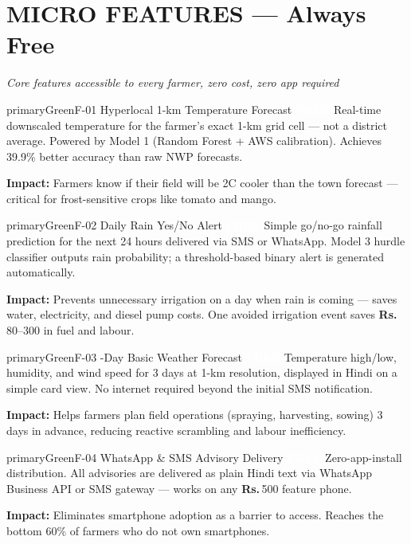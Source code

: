 \documentclass[12pt,a4paper]{article}
\newcommand{\Rup}{\textbf{Rs.\,}}
\newcommand{\freebadge}{\textcolor{white}{\colorbox{primaryGreen}{\footnotesize\textbf{FREE}}}}
\begin{document}
\pagecolor{white}
\tableofcontents
\newpage

\section{MICRO FEATURES --- Always Free}
\textit{Core features accessible to every farmer, zero cost, zero app required}

\begin{featurebox}{primaryGreen}{F-01 \quad Hyperlocal 1-km Temperature Forecast \quad \freebadge}
Real-time downscaled temperature for the farmer's exact 1-km grid cell --- not a district average. Powered by Model 1 (Random Forest + AWS calibration). Achieves 39.9\% better accuracy than raw NWP forecasts.

\textbf{Impact:} Farmers know if their field will be 2\textdegree C cooler than the town forecast --- critical for frost-sensitive crops like tomato and mango.
\end{featurebox}

\begin{featurebox}{primaryGreen}{F-02 \quad Daily Rain Yes/No Alert \quad \freebadge}
Simple go/no-go rainfall prediction for the next 24 hours delivered via SMS or WhatsApp. Model 3 hurdle classifier outputs rain probability; a threshold-based binary alert is generated automatically.

\textbf{Impact:} Prevents unnecessary irrigation on a day when rain is coming --- saves water, electricity, and diesel pump costs. One avoided irrigation event saves \Rup80--300 in fuel and labour.
\end{featurebox}

\begin{featurebox}{primaryGreen}{F-03 -Day Basic Weather Forecast \quad \freebadge}
Temperature high/low, humidity, and wind speed for 3 days at 1-km resolution, displayed in Hindi on a simple card view. No internet required beyond the initial SMS notification.

\textbf{Impact:} Helps farmers plan field operations (spraying, harvesting, sowing) 3 days in advance, reducing reactive scrambling and labour inefficiency.
\end{featurebox}

\begin{featurebox}{primaryGreen}{F-04 \quad WhatsApp \& SMS Advisory Delivery \quad \freebadge}
Zero-app-install distribution. All advisories are delivered as plain Hindi text via WhatsApp Business API or SMS gateway --- works on any \Rup500 feature phone.

\textbf{Impact:} Eliminates smartphone adoption as a barrier to access. Reaches the bottom 60\% of farmers who do not own smartphones.
\end{featurebox}
\end{document}
